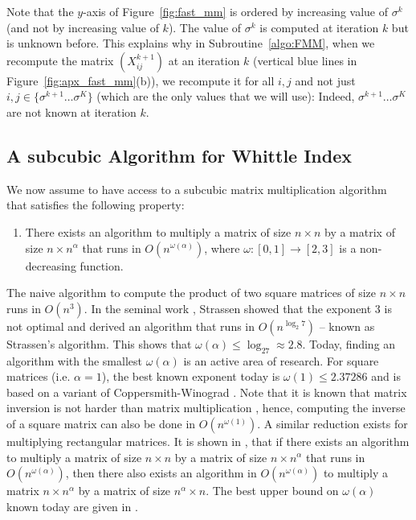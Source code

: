 \documentclass[acmsmall,screen,anonymous]{acmart}
\begin{document}
Note that the $y$-axis of Figure~\ref{fig:fast_mm} is ordered by increasing value of $\sigma^k$ (and not by increasing value of $k$). The value of $\sigma^k$ is computed at iteration $k$ but is unknown before. This explains why in Subroutine~\ref{algo:FMM}, when we recompute the matrix $(X^{k+1}_{ij})$ at an iteration $k$ (vertical blue lines in Figure~\ref{fig:apx_fast_mm}(b)), we recompute it for all $i,j$ and not just $i,j\in\{\sigma^{k+1}\dots \sigma^K\}$ (which are the only values that we will use): Indeed, $\sigma^{k+1}\dots \sigma^K$ are not known at iteration $k$. 



\subsection{A subcubic Algorithm for Whittle Index}

We now assume to have access to a subcubic matrix multiplication algorithm that satisfies the following property:
\begin{enumerate}[label=(FMM)]    
    \item \label{hypo:FMM} There exists an algorithm to multiply a matrix of size $n\times n$ by a matrix of size $n\times n^\alpha$ that runs in $O(n^{\omega(\alpha)})$, where $\omega:[0,1]\to[2,3]$ is a non-decreasing function.
\end{enumerate}
The naive algorithm to compute the product of two square matrices of size $n\times n$ runs in $O(n^3)$. In the seminal work \cite{strassen1969gaussian}, Strassen showed that the exponent $3$ is not optimal and derived an algorithm that runs in $O(n^{\log_2 7})$ -- known as Strassen's algorithm. This shows that $\omega(\alpha)\le\log_27\approx 2.8$. Today, finding an algorithm with the smallest $\omega(\alpha)$ is an active area of research. For square matrices (i.e. $\alpha=1$), the best known exponent today is $\omega(1)\le 2.37286$ \cite{alman2021refined} and is based on a variant of Coppersmith-Winograd \cite{coppersmith1987matrix}.  Note that it is known that matrix inversion is not harder than matrix multiplication \cite{cormen2009introduction}, hence, computing the inverse of a square matrix can also be done in $O(n^{\omega(1)})$. A similar reduction exists for multiplying  rectangular matrices. It is shown in \cite{pan1972schemes,huang1998fast}, that if there exists an algorithm to multiply a matrix of size $n\times n$ by a matrix of size $n \times n^\alpha$ that runs in $O(n^{\omega(\alpha)})$, then there also exists an algorithm in $O(n^{\omega(\alpha)})$ to multiply a matrix $n\times n^\alpha$ by a matrix of size $n^\alpha \times n$. The best upper bound on $\omega(\alpha)$ known today are given in \cite{gall2018improved}.
\end{document}
